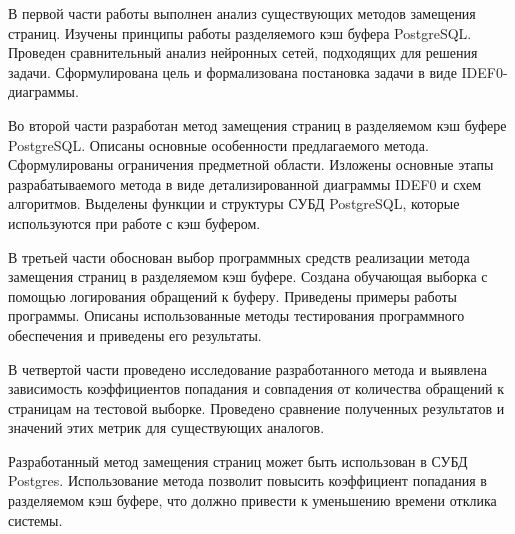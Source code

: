 В первой части работы выполнен анализ существующих методов замещения страниц. 
Изучены принципы работы разделяемого кэш буфера PostgreSQL.
Проведен сравнительный анализ нейронных сетей, подходящих для решения задачи.
Сформулирована цель и формализована постановка задачи в виде IDEF0-диаграммы.

Во второй части разработан метод замещения страниц в разделяемом кэш буфере PostgreSQL.
Описаны основные особенности предлагаемого метода.
Сформулированы ограничения предметной области.
Изложены основные этапы разрабатываемого метода в виде детализированной диаграммы IDEF0 и схем алгоритмов.
Выделены функции и структуры СУБД PostgreSQL, которые используются при работе с кэш буфером.

В третьей части обоснован выбор программных средств реализации метода замещения страниц в разделяемом кэш буфере.
Создана обучающая выборка с помощью логирования обращений к буферу. 
Приведены примеры работы программы. 
Описаны использованные методы тестирования программного обеспечения и приведены его результаты.

В четвертой части проведено исследование разработанного метода и выявлена зависимость коэффициентов попадания и совпадения от количества обращений к страницам на тестовой выборке.
Проведено сравнение полученных результатов и значений этих метрик для существующих аналогов.

Разработанный метод замещения страниц может быть использован в СУБД Postgres. 
Использование метода позволит повысить коэффициент попадания в разделяемом кэш буфере, что должно привести к уменьшению времени отклика системы. 